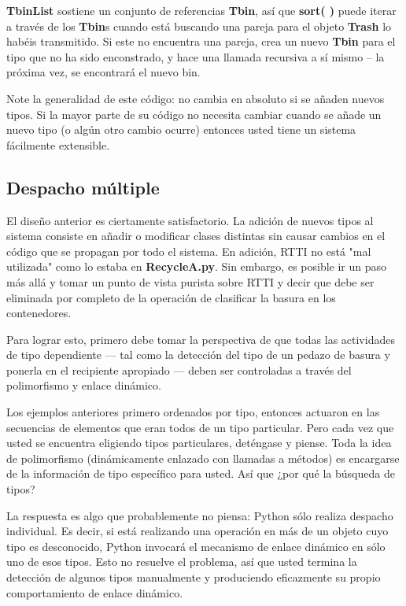 \textbf{TbinList} sostiene un conjunto de referencias \textbf{Tbin}, así que \textbf{sort( )} puede iterar a través de los \textbf{Tbin}s cuando está buscando una pareja para el objeto \textbf{Trash} lo habéis transmitido. Si este no encuentra una pareja, crea un nuevo \textbf{Tbin} para el tipo que no ha sido enconstrado, y hace una llamada recursiva a sí mismo – la próxima vez, se encontrará el nuevo bin.

Note la generalidad de este código: no cambia en absoluto si se añaden nuevos tipos. Si la mayor parte de su código no necesita cambiar cuando se añade un nuevo tipo (o algún otro cambio ocurre) entonces usted tiene un sistema fácilmente extensible.

\newpage


\subsection*{Despacho múltiple}
\label{subsec:dmul}

El diseño anterior es ciertamente satisfactorio. La adición de nuevos tipos al sistema consiste en añadir o modificar clases distintas sin causar cambios en el código que se propagan por todo el sistema. En adición, RTTI no está "mal utilizada" como lo estaba en \textbf{RecycleA.py}. Sin embargo, es posible ir un paso más allá y tomar un punto de vista purista sobre RTTI y decir que debe ser eliminada por completo de la operación de clasificar la basura en los contenedores. \newline

Para lograr esto, primero debe tomar la perspectiva de que todas las actividades de tipo dependiente — tal como la detección del tipo de un pedazo de basura y ponerla en el recipiente apropiado — deben ser controladas a través del polimorfismo y enlace dinámico. \newline

Los ejemplos anteriores primero ordenados por tipo,  entonces actuaron en las secuencias de elementos que eran todos de un tipo particular. Pero cada vez que usted se encuentra eligiendo tipos particulares, deténgase y piense. 
Toda la idea de polimorfismo (dinámicamente enlazado con llamadas a métodos) es encargarse de la información de tipo específico para usted. Así que ¿por qué la búsqueda de tipos?      \newline

La respuesta es algo que probablemente no piensa: Python sólo realiza despacho individual. Es decir, si está realizando una operación en más de un objeto cuyo tipo es desconocido, Python invocará el mecanismo de enlace dinámico en sólo uno de esos tipos. Esto no resuelve el problema, así que usted termina la detección de algunos tipos manualmente y produciendo eficazmente su propio comportamiento de enlace dinámico. \newline

